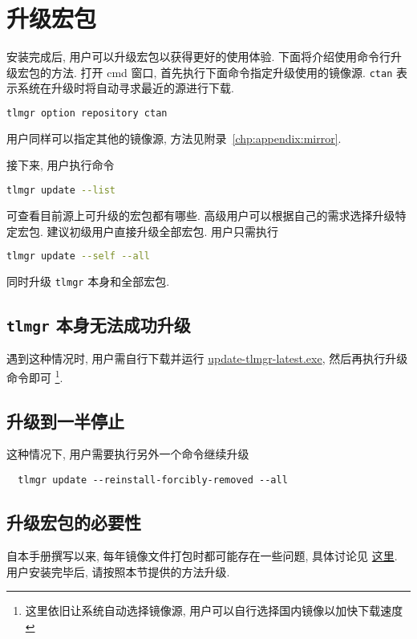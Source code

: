 \section{升级宏包}\label{sec:windows:update}

安装完成后, 用户可以升级宏包以获得更好的使用体验. 
下面将介绍使用命令行升级宏包的方法. 
打开 \textsf{cmd} 窗口, 首先执行下面命令指定升级使用的镜像源. 
\texttt{ctan} 表示系统在升级时将自动寻求最近的源进行下载. 
\begin{lstlisting}[language=bash]
  tlmgr option repository ctan
\end{lstlisting}
用户同样可以指定其他的镜像源,
方法见附录~\ref{chp:appendix:mirror}.

接下来, 用户执行命令
\begin{lstlisting}[language=bash]
  tlmgr update --list
\end{lstlisting}
可查看目前源上可升级的宏包都有哪些. 
高级用户可以根据自己的需求选择升级特定宏包.
建议初级用户直接升级全部宏包. 
用户只需执行
\begin{lstlisting}[language=bash]
  tlmgr update --self --all
\end{lstlisting}
同时升级 \texttt{tlmgr} 本身和全部宏包. 

\subsection{\texttt{tlmgr} 本身无法成功升级}

遇到这种情况时, 用户需自行下载并运行
\href{https://mirrors.ctan.org/systems/texlive/tlnet/update-tlmgr-latest.exe}{update-tlmgr-latest.exe},
然后再执行升级命令即可%
\footnote{这里依旧让系统自动选择镜像源,
用户可以自行选择国内镜像以加快下载速度}. 

\subsection{升级到一半停止}

这种情况下, 用户需要执行另外一个命令继续升级
\begin{lstlisting}
  tlmgr update --reinstall-forcibly-removed --all
\end{lstlisting}

\subsection{升级宏包的必要性}

自本手册撰写以来,
每年镜像文件打包时都可能存在一些问题,
具体讨论见%
\href{https://github.com/CTeX-org/ctex-kit/issues/569}{这里}.
用户安装完毕后,
请按照本节提供的方法升级.

